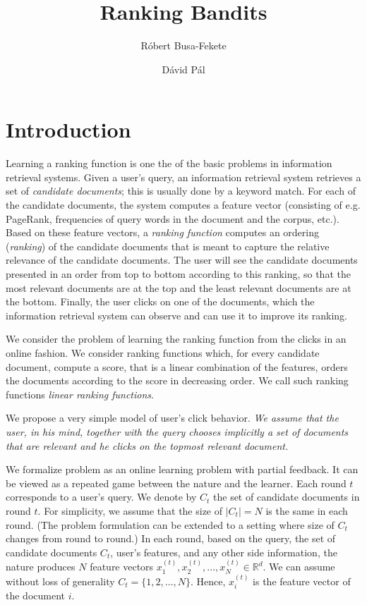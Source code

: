 \documentclass{article}
\newcommand{\R}{\mathbb{R}}
\begin{document}
\title{Ranking Bandits}
\author{R\'obert Busa-Fekete \and D\'avid P\'al}
\maketitle

\section{Introduction}

Learning a ranking function is one the of the basic problems in information
retrieval systems. Given a user's query, an information retrieval system
retrieves a set of \emph{candidate documents}; this is usually done by a keyword
match. For each of the candidate documents, the system computes a feature vector
(consisting of e.g. PageRank, frequencies of query words in the document and the
corpus, etc.). Based on these feature vectors, a \emph{ranking function}
computes an ordering (\emph{ranking}) of the candidate documents that is meant
to capture the relative relevance of the candidate documents. The user will see
the candidate documents presented in an order from top to bottom according to
this ranking, so that the most relevant documents are at the top and the least
relevant documents are at the bottom. Finally, the user clicks on one of the
documents, which the information retrieval system can observe and
can use it to improve its ranking.

We consider the problem of learning the ranking function from the clicks in
an online fashion. We consider ranking functions which, for every candidate
document, compute a score, that is a linear combination of the features, orders
the documents according to the score in decreasing order. We call such ranking
functions \emph{linear ranking functions}.

We propose a very simple model of user's click behavior. \emph{We assume that the
user, in his mind, together with the query chooses implicitly a set of documents
that are relevant and he clicks on the topmost relevant document.}

We formalize problem as an online learning problem with partial feedback. It can
be viewed as a repeated game between the nature and the learner. Each round $t$
corresponds to a user's query. We denote by $C_t$ the set of candidate documents
in round $t$. For simplicity, we assume that the size of $|C_t| = N$ is the same
in each round. (The problem formulation can be extended to a setting where size
of $C_t$ changes from round to round.) In each round, based on the query, the
set of candidate documents $C_t$, user's features, and any other side
information, the nature produces $N$ feature vectors $x_1^{(t)}, x_2^{(t)},
\dots, x_N^{(t)} \in \R^d$. We can assume without loss of generality $C_t =
\{1,2,\dots,N\}$. Hence, $x_i^{(t)}$ is the feature vector of the document $i$.
\end{document}
